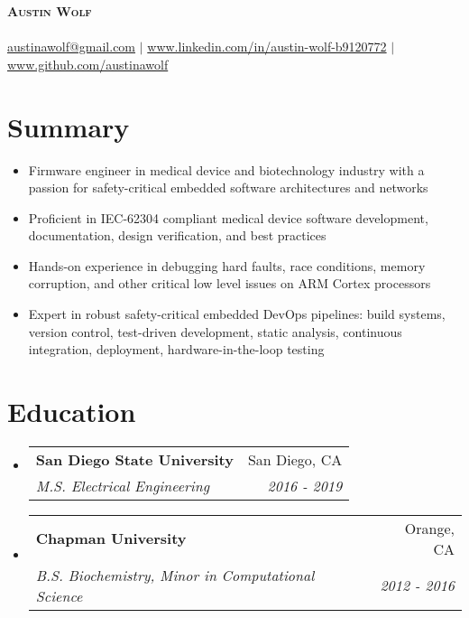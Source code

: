 \documentclass[letterpaper,11pt]{article}
\makeatletter
\newcommand{\summaryItem}[1]{
  \item\small{
    {#1 \vspace{-2pt}}
  }
}
\newcommand{\resumeSubheading}[4]{
  \vspace{-2pt}\item
    \begin{tabular*}{0.97\textwidth}[t]{l@{\extracolsep{\fill}}r}
      \textbf{#1} & #2 \\
      \textit{\small#3} & \textit{\small #4} \\
    \end{tabular*}\vspace{-7pt}
}
\newcommand{\resumeSubHeadingListStart}{\begin{itemize}[leftmargin=0.15in, label={}]}
\newcommand{\resumeSubHeadingListEnd}{\end{itemize}}
\makeatother
\begin{document}
\begin{center}
    \textbf{\Huge \scshape Austin Wolf} \\ \vspace{1pt}
    \small \textit{} \\
    \href{mailto:austinawolf@gmail.com}{austinawolf@gmail.com} $|$ 
    \href{https://www.linkedin.com/in/austin-wolf-b9120772/}{www.linkedin.com/in/austin-wolf-b9120772} $|$
    \href{https://github.com/austinawolf}{www.github.com/austinawolf}
\end{center}

\section*{Summary}
\begin{itemize}
    \summaryItem{Firmware engineer in medical device and biotechnology industry with a passion for safety-critical embedded software architectures and networks}
    \summaryItem{Proficient in IEC-62304 compliant medical device software development, documentation, design verification, and best practices}
    \summaryItem{Hands-on experience in debugging hard faults, race conditions, memory corruption, and other critical low level issues on ARM Cortex processors }
    \summaryItem{Expert in robust safety-critical embedded DevOps pipelines: build systems, version control, test-driven development, static analysis, continuous integration, deployment, hardware-in-the-loop testing}
  \end{itemize}

\section{Education}
  \resumeSubHeadingListStart
    \resumeSubheading
      {San Diego State University}{San Diego, CA}
      {M.S. Electrical Engineering}{2016 - 2019}
    \resumeSubheading
      {Chapman University}{Orange, CA}
      {B.S. Biochemistry, Minor in Computational Science}{2012 - 2016}
  \resumeSubHeadingListEnd

\end{document}
